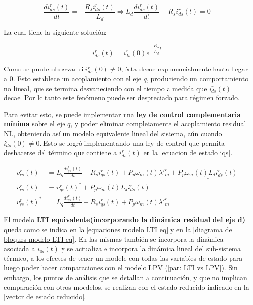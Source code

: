 \documentclass[a4paper, 10pt, onecolumn,journal]{ieeeconf}
\begin{document}
\begin{equation}
	\frac{d i^r_{ds}(t)}{dt} = -\frac{R_s i^r_{ds}(t)}{L_d} \Rightarrow L_d\frac{d i^r_{ds}(t)}{dt} + R_s i^r_{ds}(t) = 0
	\label{ecuacion dinamica residual ids}
\end{equation}

La cual tiene la siguiente solución:

\begin{equation}
	{i}^r_{ds}(t) = {i}^r_{ds}(0) e^{-\dfrac{R_s}{L_d}t} 
\end{equation}

Como se puede observar  si $i^{r}_{ds}(0)\neq0$, ésta decae exponencialmente hasta llegar a 0. Esto establece un acoplamiento con el eje $q$, produciendo un comportamiento no lineal, que se termina desvaneciendo con el tiempo a medida que $i^{r}_{ds}(t)$ decae. Por lo tanto este fenómeno puede ser despreciado para régimen forzado.

Para evitar esto, se puede implementar una \textbf{ley de control complementaria mínima} sobre el eje $q$, y poder eliminar completamente el acoplamiento residual NL, obteniendo así un modelo equivalente lineal del sistema, aún cuando $i^{r}_{ds}(0)\neq0$. Esto se logró implementando una ley de control que permita deshacerse del término que contiene a $i^{r}_{ds}(t)$ en la \cref{ecuacion de estado iqs}.

\begin{align}
	v^r_{qs}(t) &= L_q\frac{d i^r_{qs}(t)}{dt} + R_s i^r_{qs}(t) +P_p \omega_m(t) \lambda'^r_m +\underline{P_p \omega_m(t) L_d i^r_{ds}(t)} \label{ley de control complementaria 1 }\\
	v^r_{qs}(t) &= v^r_{qs}(t)^{*} + P_p \omega_m(t) L_d i^r_{ds}(t)  \label{ley de control complementaria 2}\\
 	v^r_{qs}(t)^{*} &= L_q\frac{d i^r_{qs}(t)}{dt} + R_s i^r_{qs}(t) +P_p \omega_m(t) \lambda'^r_m  \label{ley de control complementaria 3}
\end{align}

El modelo \textbf{LTI equivalente(incorporando la dinámica residual del eje $\mathbf{d}$)} queda como se indica en la \cref{equaciones modelo LTI eq} y en la \cref{diagrama de bloques modelo LTI eq}. En
las mismas también se incorpora la dinámica asociada a $i_{0s}(t)$ y se actualiza e incorpora la dinámica lineal del sub-sistema térmico, a los efectos de tener un modelo con todas las variables de estado 
para luego poder hacer comparaciones con el modelo LPV (\ref{par: LTI vs LPV}). Sin embargo, los puntos de análisis que se detallan a continuación, y que no implican
comparación con otros moedelos, se realizan con el estado reducido indicado en la \cref{vector de estado reducido}.
\end{document}

